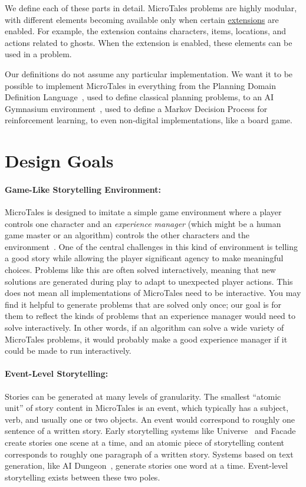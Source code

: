 \documentclass{nilreport}
\begin{document}
\noindent We define each of these parts in detail. MicroTales problems are highly modular, with different elements becoming available only when certain \hyperref[sec:extensions]{extensions} are enabled. For example, the  extension contains characters, items, locations, and actions related to ghosts. When the  extension is enabled, these elements can be used in a problem.

Our definitions do not assume any particular implementation. We want it to be possible to implement MicroTales in everything from the Planning Domain Definition Language~\cite{ghallab1998pddl}, used to define classical planning problems, to an AI Gymnasium environment~\cite{towers2024gymnasium}, used to define a Markov Decision Process for reinforcement learning, to even non-digital implementations, like a board game.

\section{Design Goals}

\paragraph{Game-Like Storytelling Environment:} MicroTales is designed to imitate a simple game environment where a player controls one character and an {\em experience manager} (which might be a human game master or an algorithm) controls the other characters and the environment~\cite{riedl2013interactive}. One of the central challenges in this kind of environment is telling a good story while allowing the player significant agency to make meaningful choices. Problems like this are often solved interactively, meaning that new solutions are generated during play to adapt to unexpected player actions. This does not mean all implementations of MicroTales need to be interactive. You may find it helpful to generate problems that are solved only once; our goal is for them to reflect the kinds of problems that an experience manager would need to solve interactively. In other words, if an algorithm can solve a wide variety of MicroTales problems, it would probably make a good experience manager if it could be made to run interactively.

\paragraph{Event-Level Storytelling:} Stories can be generated at many levels of granularity. The smallest ``atomic unit'' of story content in MicroTales is an event, which typically has a subject, verb, and usually one or two objects. An event would correspond to roughly one sentence of a written story. Early storytelling systems like Universe~\cite{lebowitz1985story} and Facade~\cite{mateas2005structuring} create stories one scene at a time, and an atomic piece of storytelling content corresponds to roughly one paragraph of a written story. Systems based on text generation, like AI Dungeon~\cite{walton2019aidungeon}, generate stories one word at a time. Event-level storytelling exists between these two poles.
\end{document}
